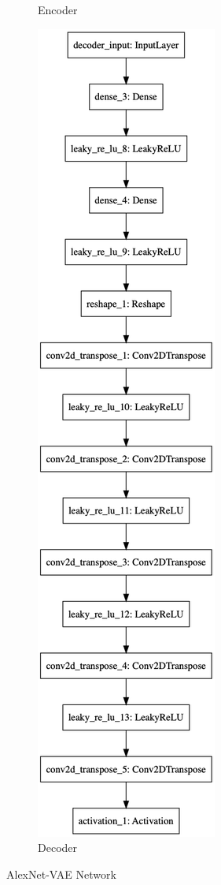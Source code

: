 \begin{figure}
\begin{subfigure}{.5\textwidth}
        \caption{Encoder}
    \end{subfigure}%
    \begin{subfigure}{.5\textwidth}
        \centering
        \includegraphics[width=\textwidth,height=.9\textheight,keepaspectratio]{alexnet-vae/decoder.png}
        \caption{Decoder}
    \end{subfigure}
    \caption{AlexNet-VAE Network}
    \label{fig:alexnet-vae-encoder}
\end{figure}

